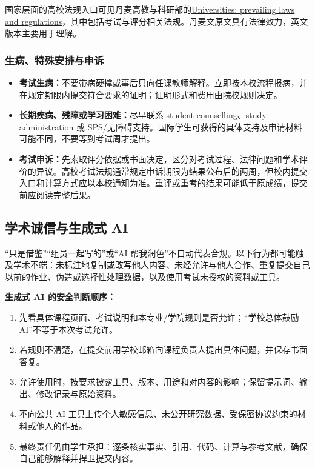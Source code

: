 国家层面的高校法规入口可见丹麦高教与科研部的\href{https://ufm.dk/en/legislation/prevailing-laws-and-regulations/education/universities}{Universities: prevailing laws and regulations}，其中包括考试与评分相关法规。丹麦文原文具有法律效力，英文版本主要用于理解。

\subsubsection*{生病、特殊安排与申诉}

\begin{itemize}
  \item \textbf{考试生病：}不要带病硬撑或事后只向任课教师解释。立即按本校流程报病，并在规定期限内提交符合要求的证明；证明形式和费用由院校规则决定。
  \item \textbf{长期疾病、残障或学习困难：}尽早联系 student counselling、study administration 或 SPS/无障碍支持。国际学生可获得的具体支持及申请材料可能不同，不要等到考试周才提出。
  \item \textbf{考试申诉：}先索取评分依据或书面决定，区分对考试过程、法律问题和学术评价的异议。高校考试法规通常规定申诉期限为结果公布后的两周，但校内提交入口和计算方式应以本校通知为准。重评或重考的结果可能低于原成绩，提交前应阅读完整后果。
\end{itemize}

\subsection{学术诚信与生成式 AI}

“只是借鉴”“组员一起写的”或“AI 帮我润色”不自动代表合规。以下行为都可能触及学术不端：未标注地复制或改写他人内容、未经允许与他人合作、重复提交自己以前的作业、伪造或选择性处理数据，以及使用考试未授权的资料或工具。

\begin{grayleftbox}
\textbf{生成式 AI 的安全判断顺序：}
\begin{enumerate}
  \item 先看具体课程页面、考试说明和本专业/学院规则是否允许；“学校总体鼓励 AI”不等于本次考试允许。
  \item 若规则不清楚，在提交前用学校邮箱向课程负责人提出具体问题，并保存书面答复。
  \item 允许使用时，按要求披露工具、版本、用途和对内容的影响；保留提示词、输出、修改记录与原始资料。
  \item 不向公共 AI 工具上传个人敏感信息、未公开研究数据、受保密协议约束的材料或他人的作品。
  \item 最终责任仍由学生承担：逐条核实事实、引用、代码、计算与参考文献，确保自己能够解释并捍卫提交内容。
\end{enumerate}
\end{grayleftbox}

